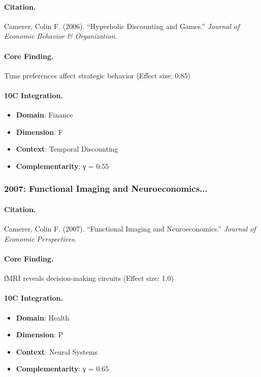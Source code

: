 \paragraph{Citation.}
Camerer, Colin F. (2006). ``Hyperbolic Discounting and Games.''
\textit{Journal of Economic Behavior & Organization}.

\paragraph{Core Finding.}
Time preferences affect strategic behavior (Effect size: 0.85)

\paragraph{10C Integration.}
\begin{itemize}[nosep]
  \item \textbf{Domain}: Finance
  \item \textbf{Dimension}: F
  \item \textbf{Context}: Temporal Discounting
  \item \textbf{Complementarity}: γ = 0.55
\end{itemize}

\subsubsection{2007: Functional Imaging and Neuroeconomics...}

\paragraph{Citation.}
Camerer, Colin F. (2007). ``Functional Imaging and Neuroeconomics.''
\textit{Journal of Economic Perspectives}.

\paragraph{Core Finding.}
fMRI reveals decision-making circuits (Effect size: 1.0)

\paragraph{10C Integration.}
\begin{itemize}[nosep]
  \item \textbf{Domain}: Health
  \item \textbf{Dimension}: P
  \item \textbf{Context}: Neural Systems
  \item \textbf{Complementarity}: γ = 0.65
\end{itemize}

